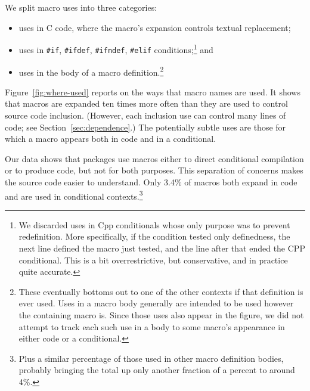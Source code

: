 \documentclass[10pt]{article}
\begin{document}
We split macro uses into three categories:
\begin{itemize}
\item uses in C code, where the macro's expansion controls textual
      replacement; 
\item uses in \texttt{\#if}, \texttt{\#ifdef}, \texttt{\#ifndef},
      \texttt{\#elif} conditions;\footnote{We discarded uses in Cpp
        conditionals whose only purpose was to prevent redefinition.
        More specifically, if the condition tested only definedness, the
        next line defined the macro just tested, and the line after that
        ended the CPP conditional.  This is a bit overrestrictive, but
        conservative, and in practice quite accurate.} and
\item uses in the body of a macro definition.\footnote{These eventually
        bottoms out to one of the other contexts if that definition is
        ever used.  Uses in a macro body generally are intended to be
        used however the containing macro is.  Since those uses also
        appear in the figure, we did not attempt to track each such use
        in a body to some macro's appearance in either code or a
        conditional.}
\end{itemize}

%

\noindent Figure~\ref{fig:where-used} reports on the ways that macro
names are used.  It shows that macros are expanded ten times more often
than they are used to control source code inclusion.  (However, each
inclusion use can control many lines of code; see
Section~\ref{sec:dependence}.)  The potentially subtle uses are those
for which a macro appears both in code and in a conditional.

Our data shows that packages use macros either to direct conditional
compilation or to produce code, but not for both purposes. This
separation of concerns makes the source code easier to understand.  Only
3.4\% of macros both expand in code and are used in conditional
contexts.\footnote{Plus a similar percentage of those used in other
  macro definition bodies, probably bringing the total up only another
  fraction of a percent to around 4\%.}  
\end{document}
